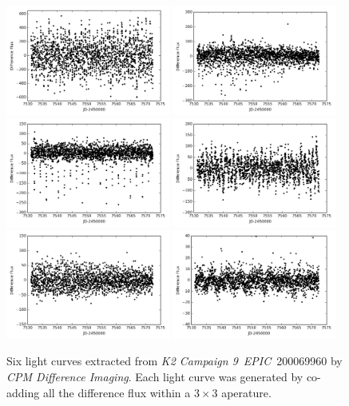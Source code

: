 \documentclass[12pt, preprint]{aastex}
\newcommand{\project}[1]{\textsl{#1}}
\newcommand{\cpmdiff}{\project{CPM Difference Imaging}}
\newcommand{\KTCN}{\project{K2 Campaign 9}}
\newcommand{\epic}{\project{EPIC}}
\begin{document}
\begin{figure}[p]
\begin{center}
\includegraphics[width=0.48\textwidth]{f4a}
\includegraphics[width=0.48\textwidth]{f4b}
\includegraphics[width=0.48\textwidth]{f4c}
\includegraphics[width=0.48\textwidth]{f4d}
\includegraphics[width=0.48\textwidth]{f4e}
\includegraphics[width=0.48\textwidth]{f4f}
\end{center}
\caption{
  \label{lightcurve}
  Six light curves extracted from \KTCN\ \epic\ 200069960 by \cpmdiff. 
  Each light curve was generated by co-adding all the difference flux within a $3\times 3$ aperature.
}
\end{figure}
\end{document}
